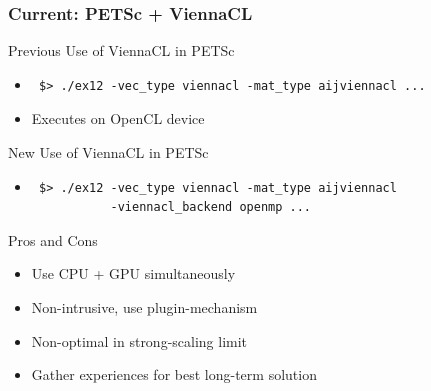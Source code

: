 \begin{frame}[fragile]
\frametitle{Current: PETSc + ViennaCL}

  \begin{block}{Previous Use of ViennaCL in PETSc}
  \begin{itemize}
   \item 
  \begin{lstlisting}
 $> ./ex12 -vec_type viennacl -mat_type aijviennacl ...
  \end{lstlisting}
   \item Executes on OpenCL device
  \end{itemize}
  \end{block}

  
  \begin{block}{New Use of ViennaCL in PETSc}
  \begin{itemize}
   \item 
  \begin{lstlisting}
 $> ./ex12 -vec_type viennacl -mat_type aijviennacl
           -viennacl_backend openmp ...
  \end{lstlisting}
  \end{itemize}
  \end{block}

  
  \begin{block}{Pros and Cons}
  \begin{itemize}
   \item Use CPU + GPU simultaneously
   \item Non-intrusive, use plugin-mechanism
   \item Non-optimal in strong-scaling limit
   \item Gather experiences for best long-term solution
  \end{itemize}
  \end{block}

\end{frame}

